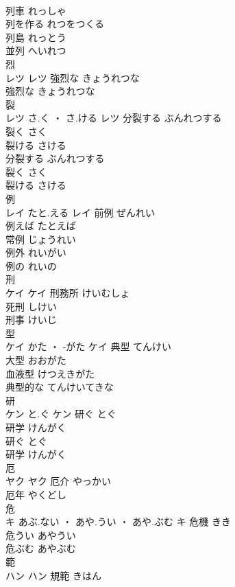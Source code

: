 \documentclass[8pt]{extreport}
\begin{document}
\begin{CJK}{UTF8}{min}
\\	列車	れっしゃ	
\\	列を作る	れつをつくる	
\\	列島	れっとう	
\\	並列	へいれつ	
\\	烈	
\\	レツ		レツ	強烈な	きょうれつな	
\\	強烈な	きょうれつな	
\\	裂	
\\	レツ	さ.く ・ さ.ける	レツ	分裂する	ぶんれつする	
\\	裂く	さく	
\\	裂ける	さける	
\\	分裂する	ぶんれつする	
\\	裂く	さく	
\\	裂ける	さける	
\\	例	
\\	レイ	たと.える	レイ	前例	ぜんれい	
\\	例えば	たとえば	
\\	常例	じょうれい	
\\	例外	れいがい	
\\	例の	れいの	
\\	刑	
\\	ケイ		ケイ	刑務所	けいむしょ	
\\	死刑	しけい	
\\	刑事	けいじ	
\\	型	
\\	ケイ	かた ・ -がた	ケイ	典型	てんけい	
\\	大型	おおがた	
\\	血液型	けつえきがた	
\\	典型的な	てんけいてきな	
\\	研	
\\	ケン	と.ぐ	ケン	研ぐ	とぐ	
\\	研学	けんがく	
\\	研ぐ	とぐ	
\\	研学	けんがく	
\\	厄	
\\	ヤク		ヤク	厄介	やっかい	
\\	厄年	やくどし	
\\	危	
\\	キ	あぶ.ない ・ あや.うい ・ あや.ぶむ	キ	危機	きき	
\\	危うい	あやうい	
\\	危ぶむ	あやぶむ	
\\	範	
\\	ハン		ハン	規範	きはん	

\end{CJK}
\end{document}
